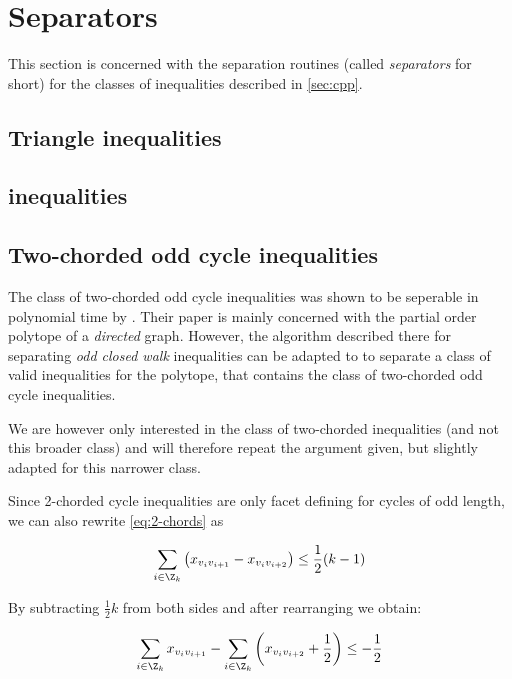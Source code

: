 \section{Separators}\label{sec:sep}
This section is concerned with the separation routines (called \textit{separators} for short) for the classes of inequalities described in \cref{sec:cpp}.

\subsection{Triangle inequalities}\label{subsec:triangel_separator}

\subsection{\texorpdfstring{\ST}{[S:T]} inequalities}\label{subsec:st_separator}

\subsection{Two-chorded odd cycle inequalities}
The class of two-chorded odd cycle inequalities was shown to be seperable in polynomial time by \cite{mullerPartialOrderPolytope1996}.
Their paper is mainly concerned with the partial order polytope of a \textit{directed} graph.
However, the algorithm described there for separating \textit{odd closed walk} inequalities can be adapted to to separate a class of valid inequalities for the \CP polytope, that contains the class of two-chorded odd cycle inequalities.

We are however only interested in the class of two-chorded inequalities (and not this broader class) and will therefore repeat the argument given, but slightly adapted for this narrower class.

Since 2-chorded cycle inequalities are only facet defining for cycles of odd length, we can also rewrite \ref{eq:2-chords} as

\begin{equation*}
	\sum_{i \in \Z_k} \left( x_{v_i v_{i+1}} - x_{v_i v_{i+2}} \right) \leq \frac{1}{2} (k-1)
\end{equation*}

By subtracting $\frac{1}{2}k$ from both sides and after rearranging we obtain:

\begin{equation*}
	\sum_{i \in \Z_k} x_{v_i v_{i+1}} - \sum_{i \in \Z_k} \left(x_{v_i v_{i+2}} + \frac{1}{2} \right) \leq -\frac{1}{2}
\end{equation*}

